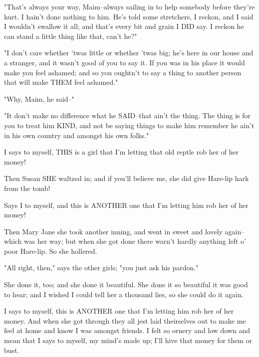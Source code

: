 "That's always your way, Maim--always sailing in to help somebody before
they're hurt.  I hain't done nothing to him.  He's told some stretchers,
I reckon, and I said I wouldn't swallow it all; and that's every bit and
grain I DID say.  I reckon he can stand a little thing like that, can't
he?"

"I don't care whether 'twas little or whether 'twas big; he's here in our
house and a stranger, and it wasn't good of you to say it.  If you was in
his place it would make you feel ashamed; and so you oughtn't to say a
thing to another person that will make THEM feel ashamed."

"Why, Maim, he said--"

"It don't make no difference what he SAID--that ain't the thing.  The
thing is for you to treat him KIND, and not be saying things to make him
remember he ain't in his own country and amongst his own folks."

I says to myself, THIS is a girl that I'm letting that old reptle rob her
of her money!

Then Susan SHE waltzed in; and if you'll believe me, she did give
Hare-lip hark from the tomb!

Says I to myself, and this is ANOTHER one that I'm letting him rob her of
her money!

Then Mary Jane she took another inning, and went in sweet and lovely
again--which was her way; but when she got done there warn't hardly
anything left o' poor Hare-lip.  So she hollered.

"All right, then," says the other girls; "you just ask his pardon."

She done it, too; and she done it beautiful.  She done it so beautiful it
was good to hear; and I wished I could tell her a thousand lies, so she
could do it again.

I says to myself, this is ANOTHER one that I'm letting him rob her of her
money.  And when she got through they all jest laid theirselves out to
make me feel at home and know I was amongst friends.  I felt so ornery
and low down and mean that I says to myself, my mind's made up; I'll hive
that money for them or bust.

